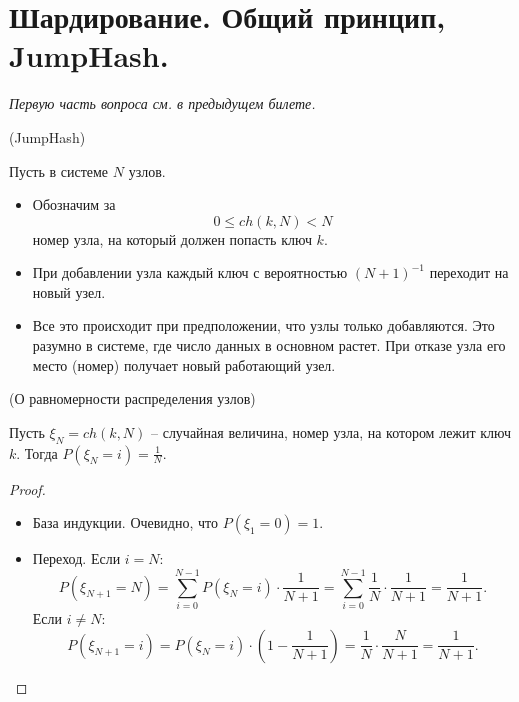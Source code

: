 \section{Шардирование. Общий принцип, JumpHash.}

\textit{Первую часть вопроса см. в предыдущем билете.}

\begin{algorithm}(JumpHash)

    Пусть в системе $N$ узлов.
    \begin{itemize}
        \item Обозначим за
            \[
                0 \leqslant ch(k, N) < N
            \]
            номер узла, на который должен попасть ключ $k$.
        \item При добавлении узла каждый ключ с вероятностью $(N + 1)^{-1}$
            переходит на новый узел.
        \item Все это происходит при предположении, что узлы только добавляются.
            Это разумно в системе, где число данных в основном растет. При отказе
            узла его место (номер) получает новый работающий узел.
    \end{itemize}
\end{algorithm}

\begin{lemma}(О равномерности распределения узлов)

    Пусть $\xi_N = ch(k, N)$ -- случайная величина, номер узла, на котором
    лежит ключ $k$. Тогда $P(\xi_N = i) = \frac{1}{N}$.
\end{lemma}
\begin{proof}
    \enewline
    \begin{itemize}
        \item База индукции. Очевидно, что $P(\xi_1 = 0) = 1$.
        \item Переход. Если $i = N$:
            \[
                P(\xi_{N + 1} = N) = \sum_{i = 0}^{N - 1}{P(\xi_N = i) \cdot
                \frac{1}{N + 1}} = \sum_{i = 0}^{N - 1}{\frac{1}{N} \cdot
                \frac{1}{N + 1}} = \frac{1}{N + 1}
            .\]
            Если $i \neq N$:
            \[
                P(\xi_{N + 1} = i) = P(\xi_N = i) \cdot \left(1 - \frac{1}{N + 1}\right)
                = \frac{1}{N} \cdot \frac{N}{N + 1} = \frac{1}{N + 1}
            .\]
    \end{itemize}
\end{proof}


